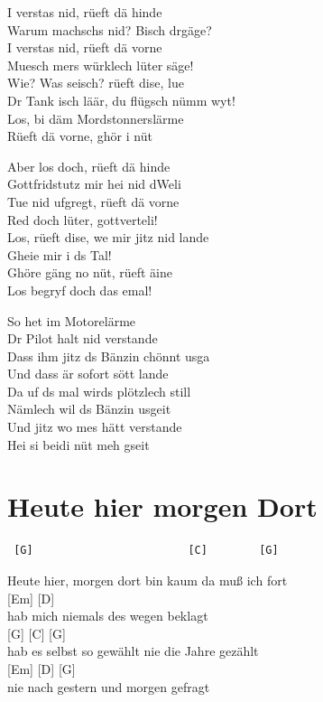 \documentclass[
  letterpaper,
]{scrbook}
\begin{document}
I versta\textquotesingle s nid, rüeft dä hinde\\
Warum machsch\textquotesingle s nid? Bisch drgäge?\\
I versta\textquotesingle s nid, rüeft dä vorne\\
Muesch mer\textquotesingle s würklech lüter säge!\\
Wie? Was seisch? rüeft dise, lue\\
Dr Tank isch läär, du flügsch nümm wyt!\\
Los, bi däm Mordstonnerslärme\\
Rüeft dä vorne, ghör i nüt

Aber los doch, rüeft dä hinde\\
Gottfridstutz mir hei nid d\textquotesingle Weli\\
Tue nid ufgregt, rüeft dä vorne\\
Red doch lüter, gottverteli!\\
Los, rüeft dise, we mir jitz nid lande\\
Gheie mir i ds Tal!\\
Ghöre gäng no nüt, rüeft äine\\
Los begryf doch das emal!

So het im Motorelärme\\
Dr Pilot halt nid verstande\\
Dass ihm jitz ds Bänzin chönnt usga\\
Und dass är sofort sött lande\\
Da uf ds mal wird\textquotesingle s plötzlech still\\
Nämlech wil ds Bänzin usgeit\\
Und jitz wo me\textquotesingle s hätt verstande\\
Hei si beidi nüt meh gseit

\hypertarget{heute-hier-morgen-dort}{%
\chapter{Heute hier morgen Dort}\label{heute-hier-morgen-dort}}

\begin{verbatim}
 [G]                        [C]        [G]
\end{verbatim}

Heute hier, morgen dort bin kaum da muß ich fort\\
{[}Em{]} {[}D{]}\\
hab mich niemals des wegen beklagt\\
{[}G{]} {[}C{]} {[}G{]}\\
hab es selbst so gewählt nie die Jahre gezählt\\
{[}Em{]} {[}D{]} {[}G{]}\\
nie nach gestern und morgen gefragt
\end{document}
